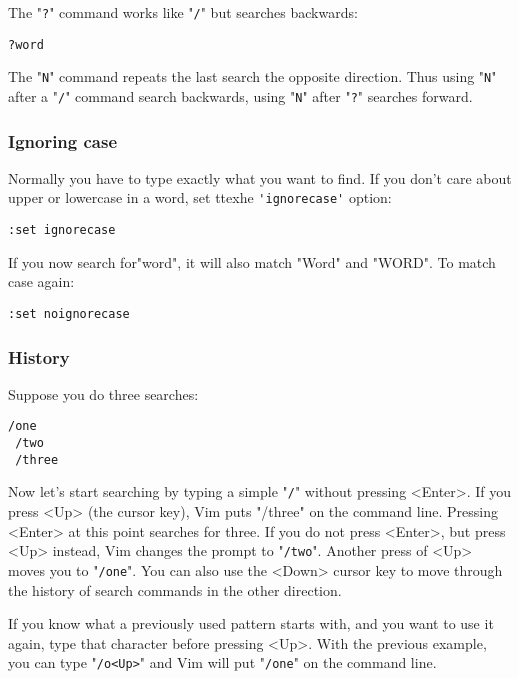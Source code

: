 The "\verb!?!" command works like "\verb!/!" but searches backwards:

 \begin{Verbatim}[samepage=true]
 ?word
 \end{Verbatim}

The "\verb!N!" command repeats the last search the opposite direction.
Thus using "\verb!N!" after a "\verb!/!" command search backwards, using "\verb!N!" after "\verb!?!" searches forward.

\subsubsection{Ignoring case}

Normally you have to type exactly what you want to find.
If you don't care about upper or lowercase in a word, set ttexhe \verb!'ignorecase'! option:

 \begin{Verbatim}[samepage=true]
 :set ignorecase
 \end{Verbatim}

If you now search for"word", it will also match "Word" and "WORD".
To match case again:

 \begin{Verbatim}[samepage=true]
 :set noignorecase
 \end{Verbatim}

\subsubsection{History}

Suppose you do three searches:

 \begin{Verbatim}[samepage=true]
 /one
 /two
 /three
 \end{Verbatim}

Now let's start searching by typing a simple "\verb!/!" without pressing <Enter>.
If you press <Up> (the cursor key), Vim puts "/three" on the command line.
Pressing <Enter> at this point searches for three.
If you do not press <Enter>, but press <Up> instead, Vim changes the prompt to "\verb!/two!".
Another press of <Up> moves you to "\verb!/one!".
You can also use the <Down> cursor key to move through the history of search commands in the other direction.

If you know what a previously used pattern starts with, and you want to use it again, type that character before pressing <Up>.
With the previous example, you can type "\verb!/o<Up>!" and Vim will put "\verb!/one!" on the command line.

